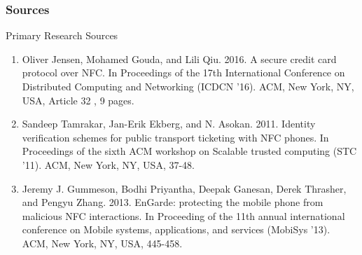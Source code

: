 \documentclass[unknownkeysallowed]{beamer}
\begin{document}
\begin{frame}
  \frametitle{Sources}
  \begin{block}{Primary Research Sources}
    \begin{enumerate}
      \item{Oliver Jensen, Mohamed Gouda, and Lili Qiu. 2016. A secure credit card protocol over NFC. In Proceedings of the 17th International Conference on Distributed Computing and Networking (ICDCN '16). ACM, New York, NY, USA, Article 32 , 9 pages. %
      }
      \item{Sandeep Tamrakar, Jan-Erik Ekberg, and N. Asokan. 2011. Identity verification schemes for public transport ticketing with NFC phones. In Proceedings of the sixth ACM workshop on Scalable trusted computing (STC '11). ACM, New York, NY, USA, 37-48. %
      }
      \item{Jeremy J. Gummeson, Bodhi Priyantha, Deepak Ganesan, Derek Thrasher, and Pengyu Zhang. 2013. EnGarde: protecting the mobile phone from malicious NFC interactions. In Proceeding of the 11th annual international conference on Mobile systems, applications, and services (MobiSys '13). ACM, New York, NY, USA, 445-458. %
      }
    \end{enumerate}
  \end{block}
\end{frame}


\end{document}
